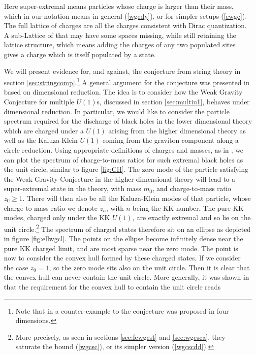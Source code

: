 \documentclass[11pt,a4paper]{article}
\numberwithin{equation}{section}
\numberwithin{table}{section}\setlength{\multlinegap}{25pt}
\begin{document}
Here super-extremal means particles whose charge is larger than their mass, which in our notation means in general (\ref{wgcdy}), or for simpler setups (\ref{ewgc}). The full lattice of charges are all the charges consistent with Dirac quantization. A sub-Lattice of that may have some spaces missing, while still retaining the lattice structure, which means adding the charges of any two populated sites gives a charge which is itself populated by a state. 

We will present evidence for, and against, the conjecture from string theory in section \ref{sec:stringcomp}.\footnote{Note that in \cite{Lee:2019tst} a counter-example to the conjecture was proposed in four dimensions.} A general argument for the conjecture was presented in \cite{Heidenreich:2015nta,Heidenreich:2016aqi} based on dimensional reduction. The idea is to consider how the Weak Gravity Conjecture for multiple $U(1)$s, discussed in section \ref{sec:multiu1}, behaves under dimensional reduction. In particular, we would like to consider the particle spectrum required for the discharge of black holes in the lower dimensional theory which are charged under a $U(1)$ arising from the higher dimensional theory as well as the Kaluza-Klein $U(1)$ coming from the graviton component along a circle reduction. Using appropriate definitions of charges and masses, as in \cite{Heidenreich:2015nta,Heidenreich:2016aqi}, we can plot the spectrum of charge-to-mass ratios for such extremal black holes as the unit circle, similar to figure \ref{fig:CH}. The zero mode of the particle satisfying the Weak Gravity Conjecture in the higher dimensional theory will lead to a super-extremal state in the theory, with mass $m_0$, and charge-to-mass ratio $z_0 \geq 1$. There will then also be all the Kaluza-Klein modes of that particle, whose charge-to-mass ratio we denote $z_n$, with $n$ being the KK number. The pure KK modes, charged only under the KK $U(1)$, are exactly extremal and so lie on the unit circle.\footnote{More precisely, as seen in sections \ref{sec:fewgcst} and \ref{sec:wgcsca}, they saturate the bound (\ref{wgcsc}), or its simpler version (\ref{wgcscdd}).} The spectrum of charged states therefore sit on an ellipse as depicted in figure \ref{fig:ellwgcl}. The points on the ellipse become infinitely dense near the pure KK charged limit, and are most sparse near the zero mode. The point is now to consider the convex hull formed by these charged states. If we consider the case $z_0=1$, so the zero mode sits also on the unit circle. Then it is clear that the convex hull can never contain the unit circle. More generally, it was shown in \cite{Heidenreich:2015nta} that the requirement for the convex hull to contain the unit circle reads
\end{document}
